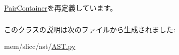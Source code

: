 \hyperlink{classslicc_1_1util_1_1PairContainer_a8b16b1e1994f9c318702b801bd3b8420}{PairContainer}を再定義しています。\hypertarget{classslicc_1_1ast_1_1AST_1_1AST_af640ba17d962addde6088eeefb07aad9}{
\subsubsection[{slicc}]{}}
\label{classslicc_1_1ast_1_1AST_1_1AST_af640ba17d962addde6088eeefb07aad9}


このクラスの説明は次のファイルから生成されました:\begin{DoxyCompactItemize}
\item 
mem/slicc/ast/\hyperlink{AST_8py}{AST.py}\end{DoxyCompactItemize}
